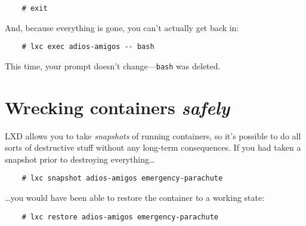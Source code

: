 \begin{verbatim}
    # exit
\end{verbatim}

And, because everything is gone, you can't actually get back in:

\begin{verbatim}
    # lxc exec adios-amigos -- bash
\end{verbatim}

This time, your prompt doesn't change---\texttt{bash} was deleted.

\section*{Wrecking containers \textit{safely}}

LXD allows you to take \textit{snapshots} of running containers, so it's possible to do all sorts of destructive stuff without any long-term consequences. If you had taken a snapshot prior to destroying everything\ldots

\begin{verbatim}
    # lxc snapshot adios-amigos emergency-parachute
\end{verbatim}

\ldots you would have been able to restore the container to a working state:

\begin{verbatim}
    # lxc restore adios-amigos emergency-parachute
\end{verbatim}
